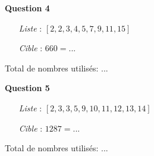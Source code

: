 \documentclass[a4paper]{article}
\begin{document}
\textbf{Question 4} \\
\begin{itemize}
	\setlength\itemsep{0.3em}
	\item[\textit{Liste}]: $[2, 2, 3, 4, 5, 7, 9, 11, 15]$
	\item[\textit{Cible}]: $660 = ...$
\end{itemize}
\vspace{0.2cm}
Total de nombres utilisés: ...
\vspace{0.8cm}

\textbf{Question 5} \\
\begin{itemize}
	\setlength\itemsep{0.3em}
	\item[\textit{Liste}]: $[2, 3, 3, 5, 9, 10, 11, 12, 13, 14]$
	\item[\textit{Cible}]: $1287 = ...$
\end{itemize}
\vspace{0.2cm}
Total de nombres utilisés: ...
\end{document}
